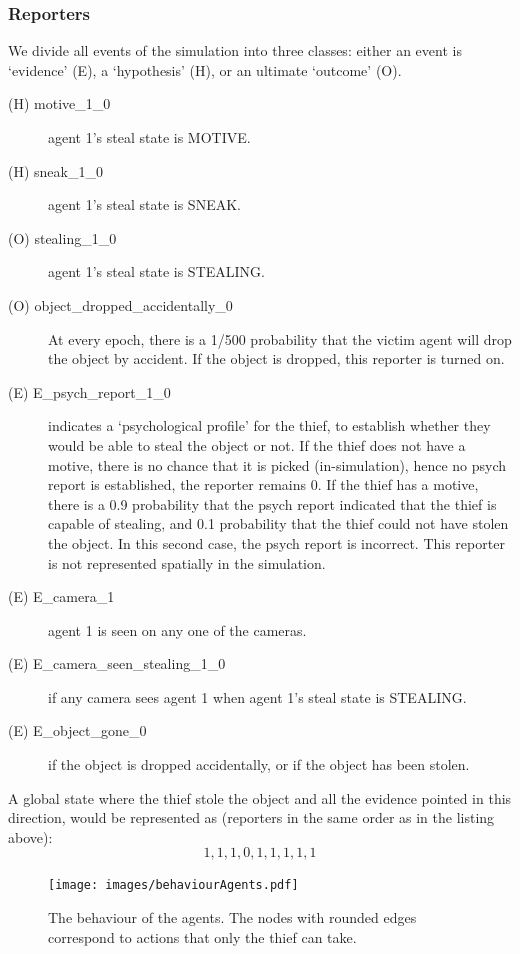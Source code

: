 \documentclass[12pt]{article}
\begin{document}
\subsubsection{Reporters}
We divide all events of the simulation into three classes: either an event is `evidence' (E), a `hypothesis' (H), or an ultimate `outcome' (O). 
\begin{description}
\item[(H) motive\_1\_0 ] agent 1's steal state is MOTIVE.
\item[(H) sneak\_1\_0 ] agent 1's steal state is SNEAK.
\item[(O) stealing\_1\_0 ] agent 1's steal state is STEALING.
\item[(O) object\_dropped\_accidentally\_0 ] At every epoch, there is a 1/500 probability that the victim agent will drop the object by accident. If the object is dropped, this reporter is turned on.
\item[(E) E\_psych\_report\_1\_0 ] indicates a `psychological profile' for the thief, to establish whether they would be able to steal the object or not. If the thief does not have a motive, there is no chance that it is picked (in-simulation), hence no psych report is established, the reporter remains 0. If the thief has a motive, there is a 0.9 probability that the psych report indicated that the thief is capable of stealing, and 0.1 probability that the thief could not have stolen the object. In this second case, the psych report is incorrect. This reporter is not represented spatially in the simulation.
\item[(E) E\_camera\_1 ] agent 1 is seen on any one of the cameras.
\item[(E) E\_camera\_seen\_stealing\_1\_0 ]  if any camera sees agent 1 when agent 1's steal state is STEALING.
\item[(E) E\_object\_gone\_0 ] if the object is dropped accidentally, or if the object has been stolen.
\end{description}



A global state where the thief stole the object and all the evidence pointed in this direction, would be represented as (reporters in the same order as in the listing above):
 \[1,1,1,0,1,1,1,1,1\]



\begin{figure}[htbp]
\centering
\texttt{[image: images/behaviourAgents.pdf]}
\caption{The behaviour of the agents. The nodes with rounded edges correspond to actions that only the thief can take.}
\label{behaviourGM}
\end{figure}
\end{document}
